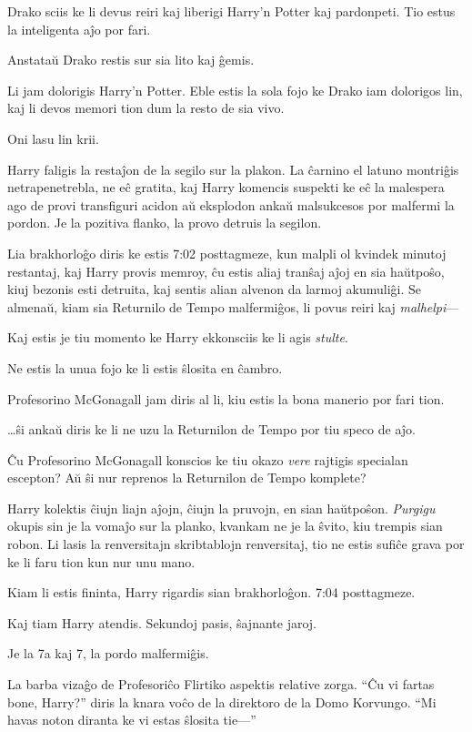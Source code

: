 Drako sciis ke li devus reiri kaj liberigi Harry'n Potter kaj pardonpeti. Tio estus la inteligenta aĵo por fari.

Anstataŭ Drako restis sur sia lito kaj ĝemis.

Li jam dolorigis Harry'n Potter. Eble estis la sola fojo ke Drako iam dolorigos lin, kaj li devos memori tion dum la resto de sia vivo.

Oni lasu lin krii.

\later

Harry faligis la restaĵon de la segilo sur la plakon. La ĉarnino el
latuno montriĝis netrapenetrebla, ne eĉ gratita, kaj Harry komencis
suspekti ke eĉ la malespera ago de provi transfiguri acidon aŭ
eksplodon ankaŭ malsukcesos por malfermi la pordon. Je la pozitiva
flanko, la provo detruis la segilon.

Lia brakhorloĝo diris ke estis 7:02 posttagmeze, kun malpli ol kvindek
minutoj restantaj, kaj Harry provis memroy, ĉu estis aliaj tranŝaj
aĵoj en sia haŭtpoŝo, kiuj bezonis esti detruita, kaj sentis alian
alvenon da larmoj akumuliĝi. Se almenaŭ, kiam sia Returnilo de Tempo
malfermiĝos, li povus reiri kaj \emph{malhelpi}—

Kaj estis je tiu momento ke Harry ekkonsciis ke li agis \emph{stulte}.

Ne estis la unua fojo ke li estis ŝlosita en ĉambro.

Profesorino McGonagall jam diris al li, kiu estis la bona manerio por
fari tion.

\ldots{}ŝi ankaŭ diris ke li ne uzu la Returnilon de Tempo por tiu speco de aĵo.

Ĉu Profesorino McGonagall konscios ke tiu okazo \emph{vere} rajtigis specialan escepton? Aŭ ŝi nur reprenos la Returnilon de Tempo komplete?

Harry kolektis ĉiujn liajn aĵojn, ĉiujn la pruvojn, en sian
haŭtpoŝon. \emph{Purgigu} okupis sin je la vomaĵo sur la planko,
kvankam ne je la ŝvito, kiu trempis sian robon. Li lasis la
renversitajn skribtablojn renversitaj, tio ne estis sufiĉe grava por
ke li faru tion kun nur unu mano.

Kiam li estis fininta, Harry rigardis sian brakhorloĝon. 7:04 posttagmeze.

Kaj tiam Harry atendis. Sekundoj pasis, ŝajnante jaroj.

Je la 7a kaj 7, la pordo malfermiĝis.

La barba vizaĝo de Profesoriĉo Flirtiko aspektis relative zorga. ``Ĉu
vi fartas bone, Harry?'' diris la knara voĉo de la direktoro de la
Domo Korvungo. ``Mi havas noton diranta ke vi estas ŝlosita tie—''

